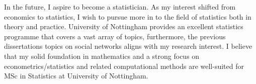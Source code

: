 In the future, I aspire to become a statistician.
As my interest shifted from economics to statistics,
I wish to pursue more in to the field of statistics both in theory and practice.
University of Nottingham provides an excellent statistics programme that covers a vast array of topics,
furthermore, the previous dissertations topics on social networks aligns with my research interest.
I believe that my solid foundation in mathematics and a strong focus on econometrics/statistics and related computational methods
are well-suited for MSc in Statistics at University of Nottingham.
